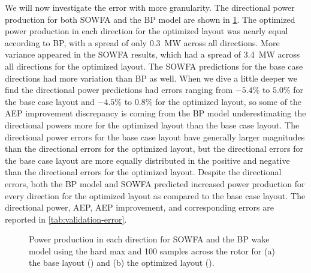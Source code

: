 \documentclass[conf]{new-aiaa}
\begin{document}
We will now investigate the error with more granularity. The directional power production for both SOWFA and the BP model are shown in \cref{fig:dir-power}. The optimized power production in each direction for the optimized layout was nearly equal according to BP, with a spread of only \SI[per-mode=symbol]{0.3}{\mega\watt} across all directions. More variance appeared in the SOWFA results, which had a spread of \SI[per-mode=symbol]{3.4}{\mega\watt} across all directions for the optimized layout. The SOWFA predictions for the base case directions had more variation than BP as well. When we dive a little deeper we find the directional power predictions had errors ranging from $-5.4\%$ to $5.0\%$ for the base case layout and $-4.5\%$ to $0.8\%$ for the optimized layout, so some of the AEP improvement discrepancy is coming from the BP model underestimating the directional powers more for the optimized layout than the base case layout. The directional power errors for the base case layout have generally larger magnitudes than the directional errors for the optimized layout, but the directional errors for the base case layout are more equally distributed in the positive and negative than the directional errors for the optimized layout. Despite the directional errors, both the BP model and SOWFA predicted increased power production for every direction for the optimized layout as compared to the base case layout. The directional power, AEP, AEP improvement, and corresponding errors are reported in \cref{tab:validation-error}.
%
\begin{figure}[ht]
	\centering
	\caption{Power production in each direction for SOWFA and the BP wake model using the hard max and 100 samples across the rotor for (a) the base layout () and (b) the optimized layout ().}
	\label{fig:dir-power}
\end{figure}
\end{document}
